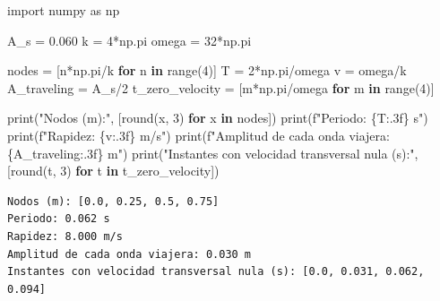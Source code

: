 \documentclass[
  letterpaper,
  DIV=11,
  numbers=noendperiod]{scrreprt}
\newenvironment{Shaded}{\begin{snugshade}}{\end{snugshade}}
\newcommand{\BuiltInTok}[1]{\textcolor[rgb]{0.00,0.23,0.31}{#1}}
\newcommand{\ControlFlowTok}[1]{\textcolor[rgb]{0.00,0.23,0.31}{\textbf{#1}}}
\newcommand{\DecValTok}[1]{\textcolor[rgb]{0.68,0.00,0.00}{#1}}
\newcommand{\FloatTok}[1]{\textcolor[rgb]{0.68,0.00,0.00}{#1}}
\newcommand{\ImportTok}[1]{\textcolor[rgb]{0.00,0.46,0.62}{#1}}
\newcommand{\KeywordTok}[1]{\textcolor[rgb]{0.00,0.23,0.31}{\textbf{#1}}}
\newcommand{\NormalTok}[1]{\textcolor[rgb]{0.00,0.23,0.31}{#1}}
\newcommand{\OperatorTok}[1]{\textcolor[rgb]{0.37,0.37,0.37}{#1}}
\newcommand{\SpecialCharTok}[1]{\textcolor[rgb]{0.37,0.37,0.37}{#1}}
\newcommand{\SpecialStringTok}[1]{\textcolor[rgb]{0.13,0.47,0.30}{#1}}
\newcommand{\StringTok}[1]{\textcolor[rgb]{0.13,0.47,0.30}{#1}}
\begin{document}
\begin{Shaded}
\begin{Highlighting}[]
\ImportTok{import}\NormalTok{ numpy }\ImportTok{as}\NormalTok{ np}

\NormalTok{A\_s }\OperatorTok{=} \FloatTok{0.060}
\NormalTok{k }\OperatorTok{=} \DecValTok{4}\OperatorTok{*}\NormalTok{np.pi}
\NormalTok{omega }\OperatorTok{=} \DecValTok{32}\OperatorTok{*}\NormalTok{np.pi}

\NormalTok{nodes }\OperatorTok{=}\NormalTok{ [n}\OperatorTok{*}\NormalTok{np.pi}\OperatorTok{/}\NormalTok{k }\ControlFlowTok{for}\NormalTok{ n }\KeywordTok{in} \BuiltInTok{range}\NormalTok{(}\DecValTok{4}\NormalTok{)]}
\NormalTok{T }\OperatorTok{=} \DecValTok{2}\OperatorTok{*}\NormalTok{np.pi}\OperatorTok{/}\NormalTok{omega}
\NormalTok{v }\OperatorTok{=}\NormalTok{ omega}\OperatorTok{/}\NormalTok{k}
\NormalTok{A\_traveling }\OperatorTok{=}\NormalTok{ A\_s}\OperatorTok{/}\DecValTok{2}
\NormalTok{t\_zero\_velocity }\OperatorTok{=}\NormalTok{ [m}\OperatorTok{*}\NormalTok{np.pi}\OperatorTok{/}\NormalTok{omega }\ControlFlowTok{for}\NormalTok{ m }\KeywordTok{in} \BuiltInTok{range}\NormalTok{(}\DecValTok{4}\NormalTok{)]}

\BuiltInTok{print}\NormalTok{(}\StringTok{"Nodos (m):"}\NormalTok{, [}\BuiltInTok{round}\NormalTok{(x, }\DecValTok{3}\NormalTok{) }\ControlFlowTok{for}\NormalTok{ x }\KeywordTok{in}\NormalTok{ nodes])}
\BuiltInTok{print}\NormalTok{(}\SpecialStringTok{f"Periodo: }\SpecialCharTok{\{}\NormalTok{T}\SpecialCharTok{:.3f\}}\SpecialStringTok{ s"}\NormalTok{)}
\BuiltInTok{print}\NormalTok{(}\SpecialStringTok{f"Rapidez: }\SpecialCharTok{\{}\NormalTok{v}\SpecialCharTok{:.3f\}}\SpecialStringTok{ m/s"}\NormalTok{)}
\BuiltInTok{print}\NormalTok{(}\SpecialStringTok{f"Amplitud de cada onda viajera: }\SpecialCharTok{\{}\NormalTok{A\_traveling}\SpecialCharTok{:.3f\}}\SpecialStringTok{ m"}\NormalTok{)}
\BuiltInTok{print}\NormalTok{(}\StringTok{"Instantes con velocidad transversal nula (s):"}\NormalTok{, [}\BuiltInTok{round}\NormalTok{(t, }\DecValTok{3}\NormalTok{) }\ControlFlowTok{for}\NormalTok{ t }\KeywordTok{in}\NormalTok{ t\_zero\_velocity])}
\end{Highlighting}
\end{Shaded}

\begin{verbatim}
Nodos (m): [0.0, 0.25, 0.5, 0.75]
Periodo: 0.062 s
Rapidez: 8.000 m/s
Amplitud de cada onda viajera: 0.030 m
Instantes con velocidad transversal nula (s): [0.0, 0.031, 0.062, 0.094]
\end{verbatim}
\end{document}
